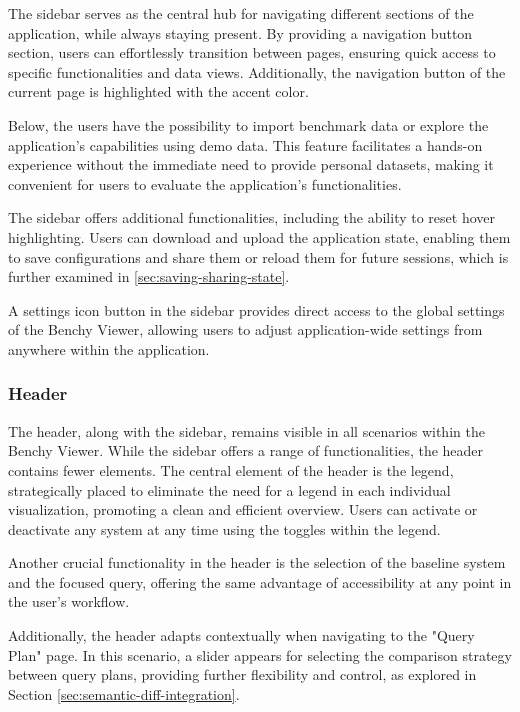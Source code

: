 The sidebar serves as the central hub for navigating different sections of the application, while always staying present. By providing a navigation button section, users can effortlessly transition between pages, ensuring quick access to specific functionalities and data views. Additionally, the navigation button of the current page is highlighted with the accent color.

Below, the users have the possibility to import benchmark data or explore the application's capabilities using demo data. This feature facilitates a hands-on experience without the immediate need to provide personal datasets, making it convenient for users to evaluate the application's functionalities.

The sidebar offers additional functionalities, including the ability to reset hover highlighting. Users can download and upload the application state, enabling them to save configurations and share them or reload them for future sessions, which is further examined in \ref{sec:saving-sharing-state}. 

A settings icon button in the sidebar provides direct access to the global settings of the Benchy Viewer, allowing users to adjust application-wide settings from anywhere within the application.



\subsubsection{Header}
The header, along with the sidebar, remains visible in all scenarios within the Benchy Viewer. While the sidebar offers a range of functionalities, the header contains fewer elements. The central element of the header is the legend, strategically placed to eliminate the need for a legend in each individual visualization, promoting a clean and efficient overview. Users can activate or deactivate any system at any time using the toggles within the legend.

Another crucial functionality in the header is the selection of the baseline system and the focused query, offering the same advantage of accessibility at any point in the user's workflow.

Additionally, the header adapts contextually when navigating to the "Query Plan" page. In this scenario, a slider appears for selecting the comparison strategy between query plans, providing further flexibility and control, as explored in Section \ref{sec:semantic-diff-integration}.



